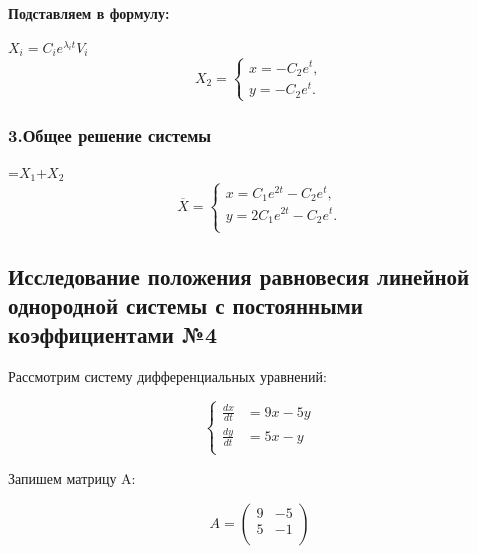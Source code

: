 \documentclass[12pt]{article}
\begin{document}
\begin{center}
    \textbf{Подставляем в формулу:}
\end{center}

\begin{center}
      $X_i=C_ie^{\lambda_it}V_i$\\
    \begin{equation*}
X_2 = 
 \begin{cases}
   x=-C_2e^t,\\
   y=-C_2e^t.
 \end{cases}
\end{equation*}
\end{center}

\subsubsection{3.Общее решение системы}

\begin{center}
=$X_1$+$X_2$
  \begin{equation*}
  \overline{X}=
 \begin{cases}
   x=C_1e^{2t}-C_2e^t,\\
   y=2C_1e^{2t}-C_2e^t.\\
 \end{cases}
\end{equation*}
\end{center}

\subsection{Исследование положения равновесия линейной однородной системы с постоянными коэффициентами №4}

Рассмотрим систему дифференциальных уравнений:

\begin{equation}
\left\{ \begin{aligned}
\frac{dx}{dt} &= 9x - 5y \\
\frac{dy}{dt} &= 5x - y \\
\end{aligned} \right.
\end{equation}

Запишем матрицу A:

\[
A =
\begin{pmatrix}
9 & -5 \\
5 & -1 \\
\end{pmatrix}
\]
\end{document}
